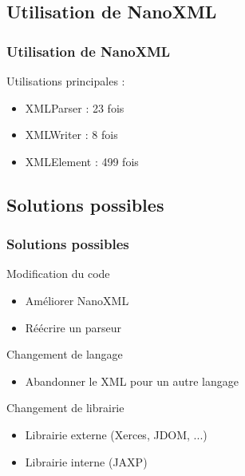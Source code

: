 \subsection{Utilisation de NanoXML}
\begin{frame}\frametitle{Utilisation de NanoXML}
Utilisations principales :
\begin{itemize}
	\item XMLParser : 23 fois
	\item XMLWriter : 8 fois
	\item XMLElement : 499 fois
\end{itemize}
\end{frame}
\subsection{Solutions possibles}
\begin{frame}\frametitle{Solutions possibles}
\begin{minipage}[c]{.46\linewidth}
\begin{beamerboxesrounded}[shadow=true]{Modification du code}
\begin{itemize}
	\item Améliorer NanoXML
	\item Réécrire un parseur
\end{itemize}
\end{beamerboxesrounded}
\end{minipage}
\hfill
\begin{minipage}[c]{.46\linewidth}
\begin{beamerboxesrounded}[shadow=true]{Changement de langage}
\begin{itemize}
	\item Abandonner le XML pour un autre langage
\end{itemize}
\end{beamerboxesrounded}
\end{minipage}
\vfill
\hfil
\begin{minipage}[c]{.8\linewidth}
\begin{beamerboxesrounded}[shadow=true]{Changement de librairie}
\begin{itemize}
	\item Librairie externe (Xerces, JDOM, ...)
	\item Librairie interne (JAXP)
\end{itemize}
\end{beamerboxesrounded}
\end{minipage}
\end{frame}
